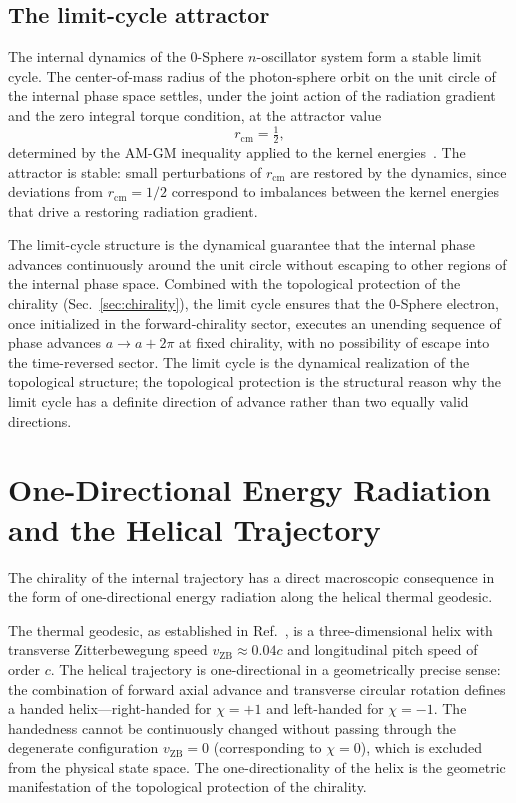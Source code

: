 \documentclass[%
 reprint, amsmath,amssymb, aps, prb, ]{revtex4-2}
\numberwithin{equation}{section}
\begin{document}
\subsection{The limit-cycle attractor}
\label{sec:limit_cycle}

The internal dynamics of the 0-Sphere $n$-oscillator system form a stable limit cycle. The center-of-mass radius of the photon-sphere orbit on the unit circle of the internal phase space settles, under the joint action of the radiation gradient and the zero integral torque condition, at the attractor value
\begin{equation}
r_{\mathrm{cm}} = \tfrac{1}{2},
\label{eq:rcm_attractor}
\end{equation}
determined by the AM-GM inequality applied to the kernel energies~\cite{hanamura50}. The attractor is stable: small perturbations of $r_{\mathrm{cm}}$ are restored by the dynamics, since deviations from $r_{\mathrm{cm}} = 1/2$ correspond to imbalances between the kernel energies that drive a restoring radiation gradient.

The limit-cycle structure is the dynamical guarantee that the internal phase advances continuously around the unit circle without escaping to other regions of the internal phase space. Combined with the topological protection of the chirality (Sec.~\ref{sec:chirality}), the limit cycle ensures that the 0-Sphere electron, once initialized in the forward-chirality sector, executes an unending sequence of phase advances $a \to a + 2\pi$ at fixed chirality, with no possibility of escape into the time-reversed sector. The limit cycle is the dynamical realization of the topological structure; the topological protection is the structural reason why the limit cycle has a definite direction of advance rather than two equally valid directions.


\section{One-Directional Energy Radiation and the Helical Trajectory}
\label{sec:helical}

The chirality of the internal trajectory has a direct macroscopic consequence in the form of one-directional energy radiation along the helical thermal geodesic.

The thermal geodesic, as established in Ref.~\cite{hanamura51}, is a three-dimensional helix with transverse Zitterbewegung speed $v_{\mathrm{ZB}} \approx 0.04 c$ and longitudinal pitch speed of order $c$. The helical trajectory is one-directional in a geometrically precise sense: the combination of forward axial advance and transverse circular rotation defines a handed helix---right-handed for $\chi = +1$ and left-handed for $\chi = -1$. The handedness cannot be continuously changed without passing through the degenerate configuration $v_{\mathrm{ZB}} = 0$ (corresponding to $\chi = 0$), which is excluded from the physical state space. The one-directionality of the helix is the geometric manifestation of the topological protection of the chirality.
\end{document}
